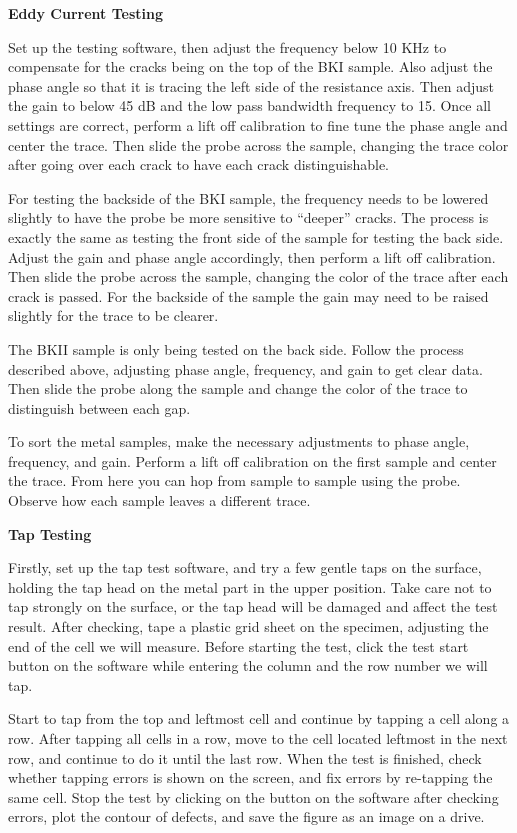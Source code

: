 \documentclass[12 pt]{report}
\begin{document}
\textbf{Eddy Current Testing}

Set up the testing software, then adjust the frequency below 10 KHz to compensate for the cracks being on the top of the BKI sample. Also adjust the phase angle so that it is tracing the left side of the resistance axis. Then adjust the gain to below 45 dB and the low pass bandwidth frequency to 15. Once all settings are correct, perform a lift off calibration to fine tune the phase angle and center the trace. Then slide the probe across the sample, changing the trace color after going over each crack to have each crack distinguishable.

For testing the backside of the BKI sample, the frequency needs to be lowered slightly to have the probe be more sensitive to “deeper” cracks. The process is exactly the same as testing the front side of the sample for testing the back side. Adjust the gain and phase angle accordingly, then perform a lift off calibration. Then slide the probe across the sample, changing the color of the trace after each crack is passed. For the backside of the sample the gain may need to be raised slightly for the trace to be clearer.

The BKII sample is only being tested on the back side. Follow the process described above, adjusting phase angle, frequency, and gain to get clear data. Then slide the probe along the sample and change the color of the trace to distinguish between each gap.

To sort the metal samples, make the necessary adjustments to phase angle, frequency, and gain. Perform a lift off calibration on the first sample and center the trace. From here you can hop from sample to sample using the probe. Observe how each sample leaves a different trace.

\textbf{Tap Testing}

Firstly, set up the tap test software, and try a few gentle taps on the surface, holding the tap head on the metal part in the upper position. Take care not to tap strongly on the surface, or the tap head will be damaged and affect the test result. After checking, tape a plastic grid sheet on the specimen, adjusting the end of the cell we will measure. Before starting the test, click the test start button on the software while entering the column and the row number we will tap.

Start to tap from the top and leftmost cell and continue by tapping a cell along a row. After tapping all cells in a row, move to the cell located leftmost in the next row, and continue to do it until the last row. When the test is finished, check whether tapping errors is shown on the screen, and fix errors by re-tapping the same cell. Stop the test by clicking on the button on the software after checking errors, plot the contour of defects, and save the figure as an image on a drive.
\end{document}
